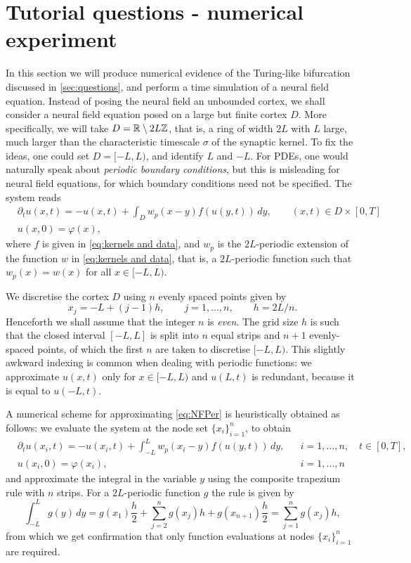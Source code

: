 \documentclass[a4paper]{siamonline220329}
\theoremstyle{plain}
\begin{document}
\section{Tutorial questions - numerical experiment}\label{sec:numerics} 
  In this section we will produce numerical evidence of the
  Turing-like bifurcation discussed in \cref{sec:questions}, and perform a time
  simulation of a neural field equation. Instead of posing the
  neural field an unbounded cortex, we shall consider a neural field equation posed
  on a large but finite cortex $D$. More specifically, we will take 
  $D = \mathbb{R}\setminus 2L \mathbb{Z}$, that is, a ring of width $2L$ with $L$ large, much
  larger than the characteristic timescale $\sigma$ of the synaptic kernel.
  To fix the ideas, one could set $D = [-L,L)$, and identify $L$ and $-L$. For PDEs,
  one would naturally speak about \textit{periodic boundary conditions}, but this is
  misleading for neural field equations, for which boundary conditions need not be
  specified. The system reads
  \begin{equation}\label{eq:NFPer}
    \begin{aligned}
    & \partial_{t}u(x,t) = -u(x,t) + \int_{D}w_p(x-y)f(u(y,t)) \,d y, \qquad (x,t) \in
    D \times [0,T] \\
    & u(x,0) = \varphi(x),
    \end{aligned}
  \end{equation}
  where $f$ is given in \cref{eq:kernels and data}, and $w_p$ is the $2L$-periodic
  extension of the function $w$ in \cref{eq:kernels and data}, that is, a
  $2L$-periodic function such that $w_p(x) = w(x)$ for all $x \in [-L,L)$.

  We discretise the cortex $D$ using $n$ evenly spaced points given by
  \[
    x_j = -L + (j-1)h, \qquad j = 1,\ldots,n, \qquad h = 2L/n.
  \]
  Henceforth we shall assume that the integer $n$ is \textit{even}. The grid size $h$
  is such that the closed interval $[-L,L]$ is split into
  $n$ equal strips and $n+1$ evenly-spaced points, of which the first $n$ are taken to
  discretise $[-L,L)$. This slightly awkward indexing is common when dealing with
  periodic functions: we approximate $u(x,t)$ only for $x \in [-L,L)$ and $u(L,t)$ is
  redundant, because it is equal to $u(-L,t)$. 

  A numerical scheme for approximating \cref{eq:NFPer} is heuristically obtained as
  follows: we evaluate the system at the node set $\{ x_i \}_{i=1}^{n}$, to obtain
  \[ %
    \begin{aligned}
    & \partial_{t}u(x_i,t) = -u(x_i,t) + \int_{-L}^L w_p(x_i-y)f(u(y,t)) \,d y, 
    && i =1,\ldots,n, \quad t \in [0,T], \\
    & u(x_i,0) = \varphi(x_i),
    && i = 1,\ldots,n
    \end{aligned}
  \]
  and approximate the integral in the variable $y$ using the composite trapezium
  rule with $n$ strips. For a $2L$-periodic function $g$ the rule is given by
  \[
    \int_{-L}^{L} g(y) \,d y = g(x_1) \frac{h}{2} + \sum_{j=2}^{n} g(x_j)h +
    g(x_{n+1}) \frac{h}{2} = \sum_{j=1}^{n} g(x_j)h,
  \]
  from which we get confirmation that only function evaluations at nodes $\{
  x_i\}_{i=1}^{n}$ are required.
\end{document}
